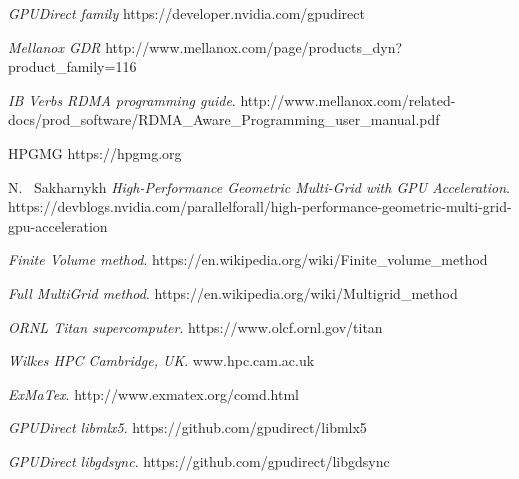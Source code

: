 \documentclass[review]{siamart1116}
\begin{document}

\begin{thebibliography}{1}


 \emph{GPUDirect family} \relax  https://developer.nvidia.com/gpudirect

 \emph{Mellanox GDR}  \relax http://www.mellanox.com/page/products\_dyn?product\_family=116

 \emph{IB Verbs RDMA programming guide}. \relax http://www.mellanox.com/related-docs/prod\_software/RDMA\_Aware\_Programming\_user\_manual.pdf

 HPGMG https://hpgmg.org

 N. ~Sakharnykh \emph{High-Performance Geometric Multi-Grid with GPU Acceleration}. \relax https://devblogs.nvidia.com/parallelforall/high-performance-geometric-multi-grid-gpu-acceleration

 \emph{Finite Volume method}. \relax https://en.wikipedia.org/wiki/Finite\_volume\_method

 \emph{Full MultiGrid method}. \relax https://en.wikipedia.org/wiki/Multigrid\_method

 \emph{ORNL Titan supercomputer}. \relax https://www.olcf.ornl.gov/titan

 \emph{Wilkes HPC Cambridge, UK}. \relax www.hpc.cam.ac.uk

 \emph{ExMaTex}. \relax http://www.exmatex.org/comd.html

 \emph{GPUDirect libmlx5}. \relax https://github.com/gpudirect/libmlx5

 \emph{GPUDirect libgdsync}. \relax https://github.com/gpudirect/libgdsync

\end{thebibliography}

%
\end{document}
